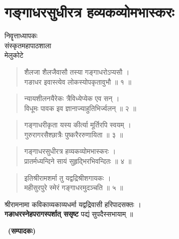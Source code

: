 \chapter{गङ्गाधरसुधीरत्र हव्यकव्योमभास्करः}

\begin{center}
\smallskip

निवॄत्ताध्यापकः\\
संस्कृतमहापाठशाला\\
मेलुकोटे
\addrule
\end{center}

\begin{verse}
शैलजा शैलजैवासौ तस्या गङ्गाधरोऽप्यसौ ।\\
गङाधर इवास्त्येव लोकस्योपकृतावुभौ ॥ १ ॥
\end{verse}

\begin{verse}
न्यायशीलनयैरेकः त्रैविध्येप्येक एव सन् ।\\
विधूमः पावक इव ज्ञानाज्याहुतिभिर्ज्वलन् ॥ २ ॥
\end{verse}

\begin{verse}
गङ्गाधरीकृता यस्य कीर्त्या मूर्तिरपि स्वयम् ।\\
गुरुरागरसैश्छात्रैः पुष्करैररुणायिता ॥ ३ ॥
\end{verse}

\begin{verse}
गङ्गाधरसुधीरत्र हव्यकव्योमभास्करः ।\\
प्रातर्मध्यन्दिने सायं सुहृद्भिरभिवन्दितः ॥ ४ ॥
\end{verse}

\begin{verse} 
इतिश्रीरामशर्मा तु यद्वद्रिश्रीशगायकः ।\\
महीसुरपुरे स्मेरं गङ्गाधरमुदञ्चति ॥ ५ ॥
\end{verse}

\begin{center}
श्रीरामनामा कविकाव्यकाव्यधर्मा यद्वद्रिवासी हरिपादसक्तः ।\\
\textbf{गङाधरस्नेहपरागस्पर्शात् ससृष्ट} पद्यं सुपदैस्सभायाम् ॥ 
\end{center}

~\hfill\textbf{(सम्पादकः)}

\articleend
